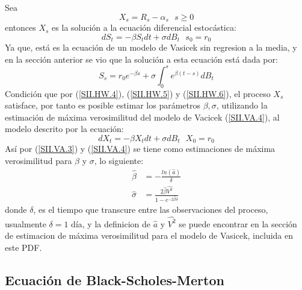 \documentclass[11pt,notitlepage]{article}
\begin{document}
    Sea 
    \begin{equation}\label{SII.HW.6}
        X_s = R_s - \alpha_{s} \ \ \ s \geq 0
    \end{equation}
    entonces \(X_s\) es la solución a la ecuación diferencial estocástica: 
    \[
         dS_t = -\beta S_tdt + \sigma dB_t \ \ \ s_0 = r_0
    \]
    Ya que, está es la ecuación de un modelo de Vasicek sin regresion a la media, y en la sección anterior se vio que la solución a esta ecuación está dada por: 
    \[
       S_s =r_0e^{-\beta s} + \sigma\int_{0}^{s}e^{\beta(t-s)}dB_t
    \]
    Condición que por (\ref{SII.HW.4}), (\ref{SII.HW.5}) y (\ref{SII.HW.6}), el proceso \(X_s\) satisface, por tanto es posible estimar
    los parámetros \(\beta, \sigma\), utilizando la estimación de máxima verosimilitud del modelo de Vacicek (\ref{SII.VA.4}), al modelo descrito por la ecuación: 
    \[
       dX_t = -\beta X_tdt + \sigma dB_t \ \ \ X_0 = r_0
    \]
    Así por (\ref{SII.VA.3}) y (\ref{SII.VA.4})  se tiene como estimaciones de máxima verosimilitud para \(\beta\) y \(\sigma\), lo siguiente: 
    \begin{align*}
        \hat{\beta} &= -\frac{ln(\hat{a})}{\delta}\\
        \hat{\sigma} &= \frac{2\hat{\beta}\hat{V^2}}{1 - e^{-2\hat{\beta}\delta}} 
    \end{align*}
    donde \(\delta\), es el tiempo que transcure entre las observaciones del proceso, usualmente \(\delta = 1\) día, y la definicion 
    de \(\hat{a}\) y \(\hat{V^2}\) se puede encontrar en la sección de estimacion de máxima verosimilitud para el modelo de Vasicek, incluida en este PDF.
    
        \subsection{Ecuación de Black-Scholes-Merton}
\end{document}
